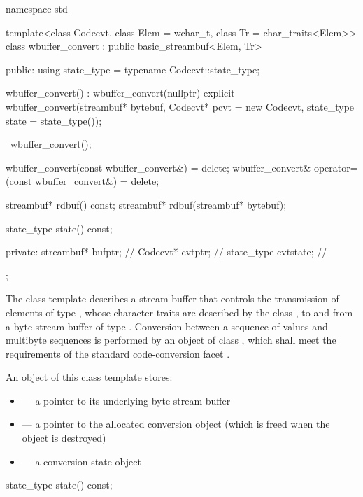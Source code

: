 %
\begin{codeblock}
namespace std {
  template<class Codecvt, class Elem = wchar_t, class Tr = char_traits<Elem>>
    class wbuffer_convert : public basic_streambuf<Elem, Tr> {
    public:
      using state_type = typename Codecvt::state_type;

      wbuffer_convert() : wbuffer_convert(nullptr) {}
      explicit wbuffer_convert(streambuf* bytebuf,
                               Codecvt* pcvt = new Codecvt,
                               state_type state = state_type());

      ~wbuffer_convert();

      wbuffer_convert(const wbuffer_convert&) = delete;
      wbuffer_convert& operator=(const wbuffer_convert&) = delete;

      streambuf* rdbuf() const;
      streambuf* rdbuf(streambuf* bytebuf);

      state_type state() const;

    private:
      streambuf* bufptr;            // \expos
      Codecvt* cvtptr;              // \expos
      state_type cvtstate;          // \expos
  };
}
\end{codeblock}

\pnum
The class template describes a stream buffer that controls the
transmission of elements of type , whose character traits are
described by the class , to and from a byte stream buffer of type
. Conversion between a sequence of  values and
multibyte sequences is performed by an object of class
, which shall meet the requirements
of the standard code-conversion facet .

\pnum
An object of this class template stores:
\begin{itemize}
\item {} --- a pointer to its underlying byte stream buffer
\item {} --- a pointer to the allocated conversion object
(which is freed when the  object is destroyed)
\item {} --- a conversion state object
\end{itemize}

%
\begin{itemdecl}
state_type state() const;
\end{itemdecl}

